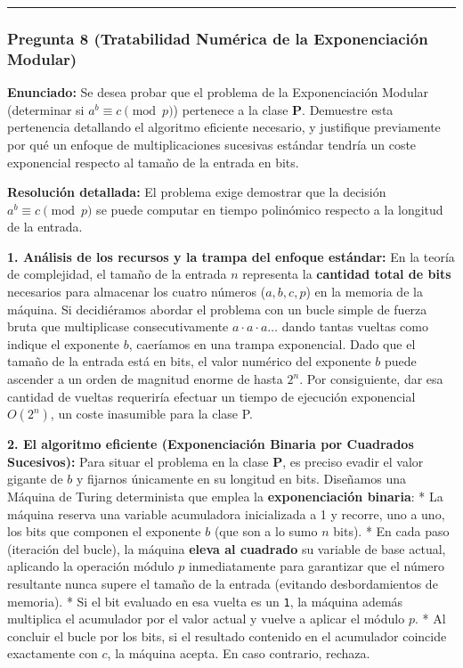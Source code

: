 \documentclass[12pt]{book} %
\begin{document}
\begin{center}\rule{0.5\linewidth}{0.5pt}\end{center}

\hypertarget{pregunta-8-tratabilidad-numuxe9rica-de-la-exponenciaciuxf3n-modular}{%
\subsubsection{Pregunta 8 (Tratabilidad Numérica de la Exponenciación
Modular)}\label{pregunta-8-tratabilidad-numuxe9rica-de-la-exponenciaciuxf3n-modular}}

\textbf{Enunciado:} Se desea probar que el problema de la Exponenciación
Modular (determinar si \(a^b \equiv c \pmod p\)) pertenece a la clase
\textbf{P}. Demuestre esta pertenencia detallando el algoritmo eficiente
necesario, y justifique previamente por qué un enfoque de
multiplicaciones sucesivas estándar tendría un coste exponencial
respecto al tamaño de la entrada en bits.

\textbf{Resolución detallada:} El problema exige demostrar que la
decisión \(a^b \equiv c \pmod p\) se puede computar en tiempo polinómico
respecto a la longitud de la entrada.

\textbf{1. Análisis de los recursos y la trampa del enfoque estándar:}
En la teoría de complejidad, el tamaño de la entrada \(n\) representa la
\textbf{cantidad total de bits} necesarios para almacenar los cuatro
números (\(a, b, c, p\)) en la memoria de la máquina. Si decidiéramos
abordar el problema con un bucle simple de fuerza bruta que multiplicase
consecutivamente \(a \cdot a \cdot a \dots\) dando tantas vueltas como
indique el exponente \(b\), caeríamos en una trampa exponencial. Dado
que el tamaño de la entrada está en bits, el valor numérico del
exponente \(b\) puede ascender a un orden de magnitud enorme de hasta
\(2^n\). Por consiguiente, dar esa cantidad de vueltas requeriría
efectuar un tiempo de ejecución exponencial \textbf{\(O(2^n)\)}, un
coste inasumible para la clase P.

\textbf{2. El algoritmo eficiente (Exponenciación Binaria por Cuadrados
Sucesivos):} Para situar el problema en la clase \textbf{P}, es preciso
evadir el valor gigante de \(b\) y fijarnos únicamente en su longitud en
bits. Diseñamos una Máquina de Turing determinista que emplea la
\textbf{exponenciación binaria}: * La máquina reserva una variable
acumuladora inicializada a 1 y recorre, uno a uno, los bits que componen
el exponente \(b\) (que son a lo sumo \(n\) bits). * En cada paso
(iteración del bucle), la máquina \textbf{eleva al cuadrado} su variable
de base actual, aplicando la operación módulo \(p\) inmediatamente para
garantizar que el número resultante nunca supere el tamaño de la entrada
(evitando desbordamientos de memoria). * Si el bit evaluado en esa
vuelta es un \texttt{1}, la máquina además multiplica el acumulador por
el valor actual y vuelve a aplicar el módulo \(p\). * Al concluir el
bucle por los bits, si el resultado contenido en el acumulador coincide
exactamente con \(c\), la máquina acepta. En caso contrario, rechaza.
\end{document}
